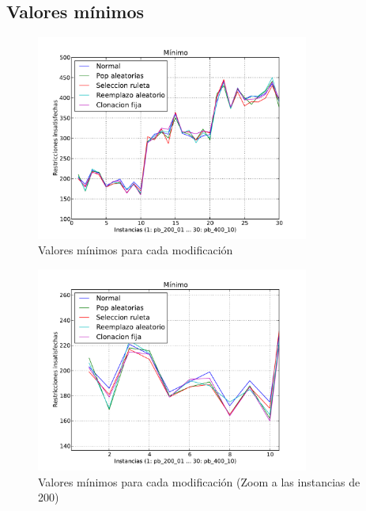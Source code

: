 \newpage

\subsection{Valores mínimos}

\begin{figure}[H]
\begin{center}
\includegraphics[width=0.8\textwidth]{img/min.pdf}
\end{center}
\caption{Valores mínimos para cada modificación}
\label{fig:min}
\end{figure}

\begin{figure}[H]
\begin{center}
\includegraphics[width=0.8\textwidth]{img/min-zoom200.pdf}
\end{center}
\caption{Valores mínimos para cada modificación (Zoom a las instancias de 200)}
\label{fig:min200}
\end{figure}

